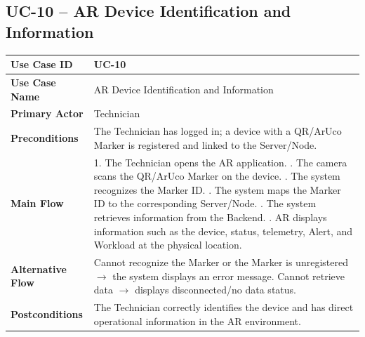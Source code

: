\subsection*{UC-10 -- AR Device Identification and Information}
\noindent
\begin{tabularx}{\textwidth}{|>{\bfseries}p{3.2cm}|X|}
\hline
Use Case ID & UC-10 \\ \hline
Use Case Name & AR Device Identification and Information \\ \hline
Primary Actor & Technician \\ \hline
Preconditions & The Technician has logged in; a device with a QR/ArUco Marker is registered and linked to the Server/Node. \\ \hline
Main Flow & 1. The Technician opens the AR application. \newline
2. The camera scans the QR/ArUco Marker on the device. \newline
3. The system recognizes the Marker ID. \newline
4. The system maps the Marker ID to the corresponding Server/Node. \newline
5. The system retrieves information from the Backend. \newline
6. AR displays information such as the device, status, telemetry, Alert, and Workload at the physical location. \\ \hline
Alternative Flow & Cannot recognize the Marker or the Marker is unregistered $\rightarrow$ the system displays an error message. Cannot retrieve data $\rightarrow$ displays disconnected/no data status. \\ \hline
Postconditions & The Technician correctly identifies the device and has direct operational information in the AR environment. \\ \hline
\end{tabularx}
